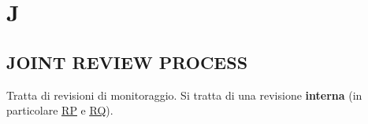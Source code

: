 \newpage
	\section{J} \label{sec:J}

		\subsection{JOINT REVIEW PROCESS}  \label{joint}
		Tratta di revisioni di monitoraggio.
		Si tratta di una revisione \textbf{interna} (in particolare  \underline{\hyperref[RP]{RP}} e \underline{\hyperref[RQ]{RQ}}).
